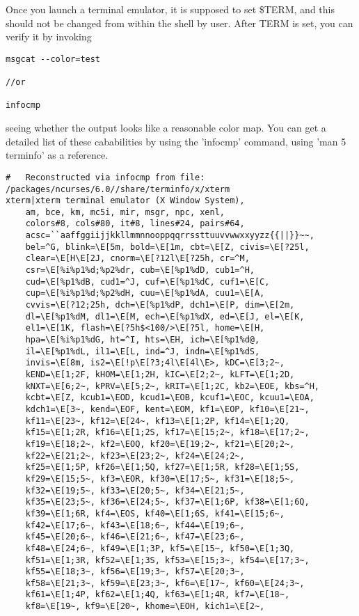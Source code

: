 Once you launch a terminal emulator, it is supposed to set \$TERM, and this
should not be changed from within the shell by user. After TERM is set, you can
verify it by invoking
\begin{verbatim}
msgcat --color=test

//or

infocmp
\end{verbatim}
seeing whether the output looks like a reasonable color map. 
You can get a detailed list of these cababilities by using the 'infocmp'
command, using 'man 5 terminfo' as a reference.
{\tiny
\begin{verbatim}
#	Reconstructed via infocmp from file: /packages/ncurses/6.0//share/terminfo/x/xterm
xterm|xterm terminal emulator (X Window System),
	am, bce, km, mc5i, mir, msgr, npc, xenl,
	colors#8, cols#80, it#8, lines#24, pairs#64,
	acsc=``aaffggiijjkkllmmnnooppqqrrssttuuvvwwxxyyzz{{||}}~~,
	bel=^G, blink=\E[5m, bold=\E[1m, cbt=\E[Z, civis=\E[?25l,
	clear=\E[H\E[2J, cnorm=\E[?12l\E[?25h, cr=^M,
	csr=\E[%i%p1%d;%p2%dr, cub=\E[%p1%dD, cub1=^H,
	cud=\E[%p1%dB, cud1=^J, cuf=\E[%p1%dC, cuf1=\E[C,
	cup=\E[%i%p1%d;%p2%dH, cuu=\E[%p1%dA, cuu1=\E[A,
	cvvis=\E[?12;25h, dch=\E[%p1%dP, dch1=\E[P, dim=\E[2m,
	dl=\E[%p1%dM, dl1=\E[M, ech=\E[%p1%dX, ed=\E[J, el=\E[K,
	el1=\E[1K, flash=\E[?5h$<100/>\E[?5l, home=\E[H,
	hpa=\E[%i%p1%dG, ht=^I, hts=\EH, ich=\E[%p1%d@,
	il=\E[%p1%dL, il1=\E[L, ind=^J, indn=\E[%p1%dS,
	invis=\E[8m, is2=\E[!p\E[?3;4l\E[4l\E>, kDC=\E[3;2~,
	kEND=\E[1;2F, kHOM=\E[1;2H, kIC=\E[2;2~, kLFT=\E[1;2D,
	kNXT=\E[6;2~, kPRV=\E[5;2~, kRIT=\E[1;2C, kb2=\EOE, kbs=^H,
	kcbt=\E[Z, kcub1=\EOD, kcud1=\EOB, kcuf1=\EOC, kcuu1=\EOA,
	kdch1=\E[3~, kend=\EOF, kent=\EOM, kf1=\EOP, kf10=\E[21~,
	kf11=\E[23~, kf12=\E[24~, kf13=\E[1;2P, kf14=\E[1;2Q,
	kf15=\E[1;2R, kf16=\E[1;2S, kf17=\E[15;2~, kf18=\E[17;2~,
	kf19=\E[18;2~, kf2=\EOQ, kf20=\E[19;2~, kf21=\E[20;2~,
	kf22=\E[21;2~, kf23=\E[23;2~, kf24=\E[24;2~,
	kf25=\E[1;5P, kf26=\E[1;5Q, kf27=\E[1;5R, kf28=\E[1;5S,
	kf29=\E[15;5~, kf3=\EOR, kf30=\E[17;5~, kf31=\E[18;5~,
	kf32=\E[19;5~, kf33=\E[20;5~, kf34=\E[21;5~,
	kf35=\E[23;5~, kf36=\E[24;5~, kf37=\E[1;6P, kf38=\E[1;6Q,
	kf39=\E[1;6R, kf4=\EOS, kf40=\E[1;6S, kf41=\E[15;6~,
	kf42=\E[17;6~, kf43=\E[18;6~, kf44=\E[19;6~,
	kf45=\E[20;6~, kf46=\E[21;6~, kf47=\E[23;6~,
	kf48=\E[24;6~, kf49=\E[1;3P, kf5=\E[15~, kf50=\E[1;3Q,
	kf51=\E[1;3R, kf52=\E[1;3S, kf53=\E[15;3~, kf54=\E[17;3~,
	kf55=\E[18;3~, kf56=\E[19;3~, kf57=\E[20;3~,
	kf58=\E[21;3~, kf59=\E[23;3~, kf6=\E[17~, kf60=\E[24;3~,
	kf61=\E[1;4P, kf62=\E[1;4Q, kf63=\E[1;4R, kf7=\E[18~,
	kf8=\E[19~, kf9=\E[20~, khome=\EOH, kich1=\E[2~,

\end{verbatim}}
